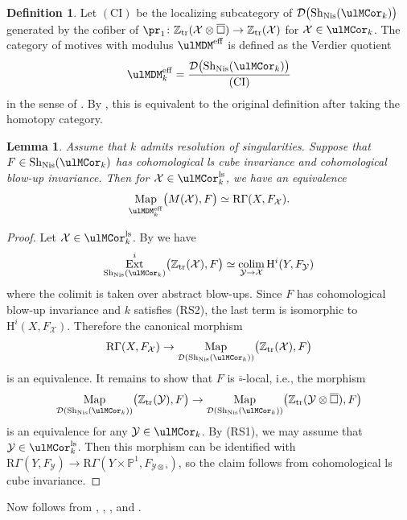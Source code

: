 \documentclass{amsart}
\theoremstyle{plain}
\newtheorem{lemma}[theorem]{Lemma}
\theoremstyle{definition}
\newtheorem{definition}[theorem]{Definition}
\theoremstyle{remark}
\numberwithin{equation}{section}
\newcommand{\bcube}{{\overline{\square}}}
\DeclareMathOperator{\Sh}{Sh}
\DeclareMathOperator{\Map}{Map}
\DeclareMathOperator{\Ext}{Ext}
\def\tr{\mathrm{tr}}
\def\Nis{\mathrm{Nis}}
\def\eff{\mathrm{eff}}
\def\ls{\mathrm{ls}}
\begin{document}
\begin{definition}
	Let $(\mathrm{CI})$ be the localizing subcategory of $\mathcal{D}\bigl(\Sh_\Nis(\ulMCor_k)\bigr)$ generated by the cofiber of $\pr_1\colon \mathbb{Z}_\tr(\mathcal{X}\otimes \bcube)\to \mathbb{Z}_\tr(\mathcal{X})$ for $\mathcal{X}\in \ulMCor_k$.
	The category of motives with modulus $\ulMDM^\eff$ is defined as the Verdier quotient
	$$
		\ulMDM^\eff_k = \frac{\mathcal{D}\bigl(\Sh_\Nis(\ulMCor_k)\bigr)}{(\mathrm{CI})}
	$$
	in the sense of \cite[Definition 5.4]{BGT}.
	By \cite[Theorem 4.1.1]{KMSY3}, this is equivalent to the original definition \cite[Definition 3.2.4]{KMSY3} after taking the homotopy category.
\end{definition}



\begin{lemma}\label{general_realization}
	Assume that $k$ admits resolution of singularities.
	Suppose that $F\in \Sh_\Nis(\ulMCor_k)$ has cohomological ls cube invariance and cohomological blow-up invariance.
	Then for $\mathcal{X}\in \ulMCor_k^\ls$, we have an equivalence
	$$
		\Map_{\ulMDM^\eff_k}\bigl(M(\mathcal{X}),F\bigr) \simeq \mathrm{R}\Gamma(X,F_\mathcal{X}).
	$$
\end{lemma}

\begin{proof}
	Let $\mathcal{X}\in \ulMCor_k^\ls$.
	By \cite[Theorem 4.6.3]{KMSY1} we have
	\begin{align*}
		\Ext^i_{\Sh_\Nis(\ulMCor_k)}\bigl(\mathbb{Z}_\tr(\mathcal{X}),F\bigr)\simeq \colim_{\mathcal{Y}\to \mathcal{X}} \mathrm{H}^i(Y,F_\mathcal{Y})
	\end{align*}
	where the colimit is taken over abstract blow-ups.
	Since $F$ has cohomological blow-up invariance and $k$ satisfies (RS2), the last term is isomorphic to $\mathrm{H}^i(X,F_\mathcal{X})$.
	Therefore the canonical morphism
	$$
		\mathrm{R}\Gamma(X,F_\mathcal{X})\to \Map_{\mathcal{D}(\Sh_\Nis(\ulMCor_k))} \bigl(\mathbb{Z}_\tr(\mathcal{X}),F\bigr)
	$$
	is an equivalence.
	It remains to show that $F$ is $\bcube$-local, i.e., the morphism
	$$
		\Map_{\mathcal{D}(\Sh_\Nis(\ulMCor_k))} \bigl(\mathbb{Z}_\tr(\mathcal{Y}),F\bigr)\to
		\Map_{\mathcal{D}(\Sh_\Nis(\ulMCor_k))} \bigl(\mathbb{Z}_\tr(\mathcal{Y}\otimes\bcube),F\bigr)
	$$
	is an equivalence for any $\mathcal{Y}\in \ulMCor_k$.
	By (RS1), we may assume that $\mathcal{Y}\in \ulMCor_k^\ls$.
	Then this morphism can be identified with $\mathrm{R}\Gamma(Y,F_\mathcal{Y})\to \mathrm{R}\Gamma(Y\times\mathbb{P}^1,F_\mathcal{Y\otimes\bcube})$, so the claim follows from cohomological ls cube invariance.
\end{proof}

Now  follows from , , , and .



\printbibliography
\end{document}
